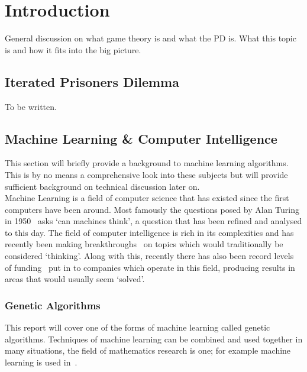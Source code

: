 
\chapter{Introduction}\label{ch:intro}

General discussion on what game theory is and what the PD is.
What this topic is and how it fits into the big picture.\\

\section{Iterated Prisoners Dilemma}\label{sec:iteratedPrisonersDilemma}
To be written.
\section{Machine Learning \& Computer Intelligence}\label{sec:machineLearningAndcomputerIntelligence}
This section will briefly provide a background to machine learning algorithms.
This is by no means a comprehensive look into these subjects but will provide sufficient background on technical discussion later on.\\

Machine Learning is a field of computer science that has existed since the first computers have been around.
Most famously the questions posed by Alan Turing in 1950~\cite{turing1950computing} asks `can machines think', a question that has been refined and analysed to this day.
The field of computer intelligence is rich in its complexities and has recently been making breakthroughs~\cite{knight2017alphaZeroMIT} on topics which would traditionally be considered `thinking'.
Along with this, recently there has also been record levels of funding~\cite{chui2017artificial} put in to companies which operate in this field, producing results in areas that would usually seem `solved'.\\

\subsection{Genetic Algorithms}\label{subsec:geneticAlgorithms}
This report will cover one of the forms of machine learning called genetic algorithms.
Techniques of machine learning can be combined and used together in many situations, the field of mathematics research is one;
for example machine learning is used in~\cite{chu1997genetic}.\\

